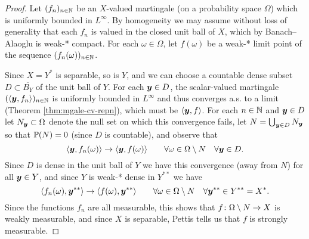 \begin{proof}
  Let $(f_n)_{n \in \N}$ be an $X$-valued martingale (on a probability space $\Omega$) which is uniformly bounded in $L^\infty$.
  By homogeneity we may assume without loss of generality that each $f_n$ is valued in the closed unit ball of $X$, which by Banach--Alaoglu is weak-* compact.
  For each $\omega \in \Omega$, let $f(\omega)$ be a weak-* limit point of the sequence $(f_n(\omega))_{n \in \N}$.
  
  Since $X = Y^*$ is separable, so is $Y$, and we can choose a countable dense subset $D \subset \overline{B_{Y}}$ of the unit ball of $Y$.
  For each $\mb{y} \in D$, the scalar-valued martingale $(\langle \mb{y}, f_n \rangle)_{n \in \N}$ is uniformly bounded in $L^\infty$ and thus converges a.s. to a limit (Theorem \ref{thm:mgale-cv-repn}), which must be $\langle \mb{y}, f \rangle$.
  For each $n \in \N$ and $\mb{y} \in D$ let $N_{\mb{y}} \subset \Omega$ denote the null set on which this convergence fails, let $N = \bigcup_{\mb{y} \in D} N_{\mb{y}}$ so that $\P(N) = 0$ (since $D$ is countable), and observe that
  \begin{equation*}
    \langle \mb{y}, f_n(\omega) \rangle \to \langle \mb{y}, f(\omega) \rangle \qquad \forall \omega \in \Omega \sm N \quad \forall \mb{y} \in D.
  \end{equation*}
  Since $D$ is dense in the unit ball of $Y$ we have this convergence (away from $N$) for all $\mb{y} \in Y$, and since $Y$ is weak-* dense in $Y^{**}$ we have
    \begin{equation*}
      \langle f_n(\omega), \mb{y}^{**} \rangle \to \langle f(\omega), \mb{y}^{**} \rangle \qquad \forall \omega \in \Omega \sm N \quad \forall \mb{y}^{**} \in Y^{**} = X^{*}.
  \end{equation*}
  Since the functions $f_n$ are all measurable, this shows that $\map{f}{\Omega \sm N}{X}$ is weakly measurable, and since $X$ is separable, Pettis tells us that $f$ is strongly measurable.


\end{proof}
